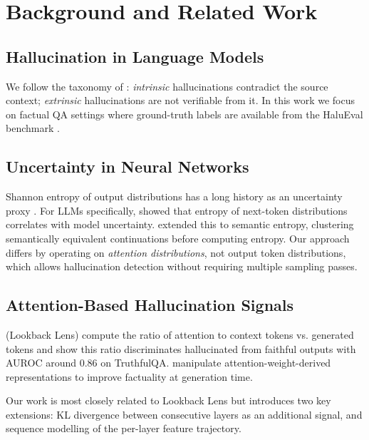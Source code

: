 \documentclass[11pt]{article}
\begin{document}
\section{Background and Related Work}

\subsection{Hallucination in Language Models}

We follow the taxonomy of \citet{huang2023survey}: 
\emph{intrinsic} hallucinations contradict the source context; 
\emph{extrinsic} hallucinations are not verifiable from it. 
In this work we focus on factual QA settings where ground-truth labels 
are available from the HaluEval benchmark \citep{li2023halueval}.

\subsection{Uncertainty in Neural Networks}

Shannon entropy of output distributions has a long history as an uncertainty 
proxy \citep{shannon1948mathematical}. 
For LLMs specifically, \citet{malinin2021uncertainty} showed that entropy 
of next-token distributions correlates with model uncertainty. 
\citet{kuhn2023semantic} extended this to semantic entropy, clustering 
semantically equivalent continuations before computing entropy.
Our approach differs by operating on \emph{attention distributions}, 
not output token distributions, which allows hallucination detection 
without requiring multiple sampling passes.

\subsection{Attention-Based Hallucination Signals}

\citet{chuang2024lookback} (Lookback Lens) compute the ratio of attention 
to context tokens vs. generated tokens and show this ratio discriminates 
hallucinated from faithful outputs with AUROC around 0.86 on TruthfulQA.
\citet{chuang2023dola} manipulate attention-weight-derived representations 
to improve factuality at generation time.

Our work is most closely related to Lookback Lens but introduces two key 
extensions: KL divergence between consecutive layers as an additional signal, 
and sequence modelling of the per-layer feature trajectory.
\end{document}
